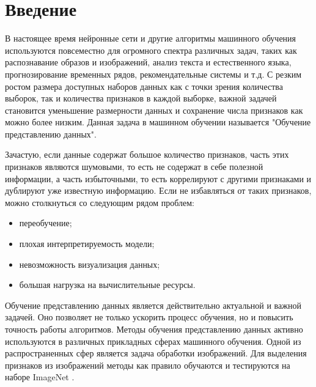 \section{Введение}
\label{sec:Chapter0} 




В настоящее время нейронные сети и другие алгоритмы машинного обучения используются повсеместно для огромного спектра различных задач, таких как распознавание образов и изображений, анализ текста и естественного языка, прогнозирование временных рядов, рекомендательные системы и т.д. С резким ростом размера доступных наборов данных как с точки зрения количества выборок, так и количества признаков в каждой выборке, важной задачей становится уменьшение размерности данных и сохранение числа признаков как можно более низким. Данная задача в машинном обучении называется "Обучение представлению данных". 

Зачастую, если данные содержат большое количество признаков, часть этих признаков являются шумовыми, то есть не содержат в себе полезной информации, а часть избыточными, то есть коррелируют с другими признаками и дублируют уже известную информацию. Если не избавляться от таких признаков, можно столкнуться со следующим рядом проблем:
\begin{itemize}
    \item переобучение;
    \item плохая интерпретируемость модели;
    \item невозможность визуализация данных;
    \item большая нагрузка на вычислительные ресурсы.
\end{itemize} 

Обучение представлению данных является действительно актуальной и важной задачей. Оно позволяет не только ускорить процесс обучения, но и повысить точность работы алгоритмов. Методы обучения представлению данных активно используются в различных прикладных сферах машинного обучения. Одной из распространенных сфер является задача обработки изображений. Для выделения признаков из изображений методы как правило обучаются и тестируются на наборе ImageNet \cite{ImageNet}. 

